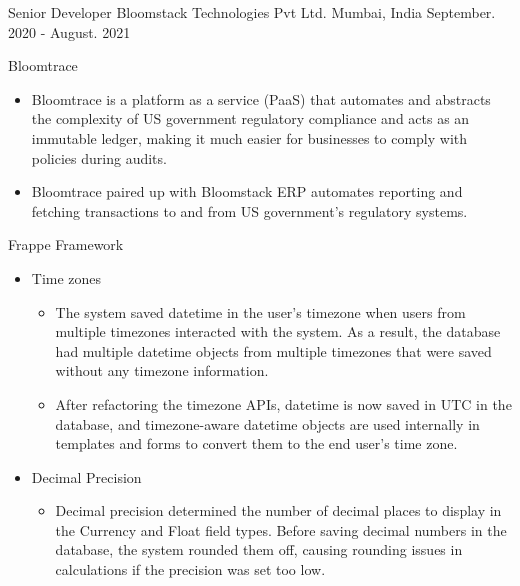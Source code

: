 

\begin{cventries}
  \cventry
    {Senior Developer} %
    {Bloomstack Technologies Pvt Ltd.} %
    {Mumbai, India} %
    {September. 2020 - August. 2021} %
    {
      \begin{cvitems} %
        \item {Bloomtrace}
            \begin{itemize}
                \item {Bloomtrace is a platform as a service (PaaS) that automates and abstracts the complexity of US government regulatory compliance and acts as an immutable ledger, making it much easier for businesses to comply with policies during audits.}
                \item {Bloomtrace paired up with Bloomstack ERP automates reporting and fetching transactions to and from US government's regulatory systems.}
            \end{itemize}
        \item {Frappe Framework}
            \begin{itemize}
                \item {Time zones}
                    \begin{itemize}
                        \item {The system saved datetime in the user's timezone when users from multiple timezones interacted with the system. As a result, the database had multiple datetime objects from multiple timezones that were saved without any timezone information.}
                        \item {After refactoring the timezone APIs, datetime is now saved in UTC in the database, and timezone-aware datetime objects are used internally in templates and forms to convert them to the end user's time zone.}
                    \end{itemize}
                \item {Decimal Precision}
                    \begin{itemize}
                        \item {Decimal precision determined the number of decimal places to display in the Currency and Float field types. Before saving decimal numbers in the database, the system rounded them off, causing rounding issues in calculations if the precision was set too low.}

\end{itemize}
\end{itemize}
\end{cvitems}}
\end{cventries}
